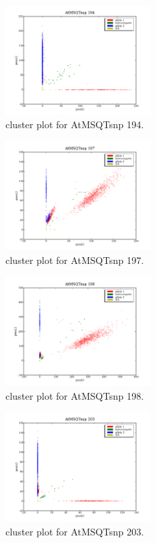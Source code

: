 \begin{figure}[H]
\includegraphics[width=0.5\textwidth]{figures/cluster_plot_AtMSQTsnp_194.png}
\caption{cluster plot for AtMSQTsnp 194.} \label{flAtMSQTsnp194}
\end{figure}

\begin{figure}[H]
\includegraphics[width=0.5\textwidth]{figures/cluster_plot_AtMSQTsnp_197.png}
\caption{cluster plot for AtMSQTsnp 197.} \label{flAtMSQTsnp197}
\end{figure}

\begin{figure}[H]
\includegraphics[width=0.5\textwidth]{figures/cluster_plot_AtMSQTsnp_198.png}
\caption{cluster plot for AtMSQTsnp 198.} \label{flAtMSQTsnp198}
\end{figure}

\begin{figure}[H]
\includegraphics[width=0.5\textwidth]{figures/cluster_plot_AtMSQTsnp_203.png}
\caption{cluster plot for AtMSQTsnp 203.} \label{flAtMSQTsnp203}
\end{figure}

